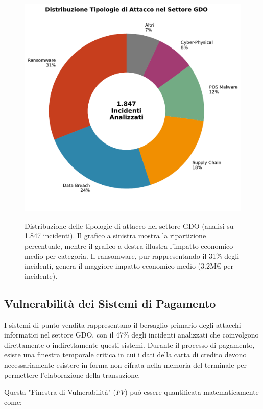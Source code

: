 \begin{figure}[htbp]
\centering
\includegraphics[width=\textwidth]{thesis_figures/cap2/fig_2_2_attack_types.pdf}
\caption{Distribuzione delle tipologie di attacco nel settore GDO (analisi su 1.847 incidenti). Il grafico a sinistra mostra la ripartizione percentuale, mentre il grafico a destra illustra l'impatto economico medio per categoria. Il ransomware, pur rappresentando il 31\% degli incidenti, genera il maggiore impatto economico medio (3.2M€ per incidente).}\autocite{CPR2025}
\label{fig:attack_types}
\end{figure}

\subsection{Vulnerabilità dei Sistemi di Pagamento}

I sistemi di punto vendita rappresentano il bersaglio primario degli attacchi informatici nel settore GDO, con il 47\% degli incidenti analizzati che coinvolgono direttamente o indirettamente questi sistemi. Durante il processo di pagamento, esiste una finestra temporale critica in cui i dati della carta di credito devono necessariamente esistere in forma non cifrata nella memoria del terminale per permettere l'elaborazione della transazione.

Questa "Finestra di Vulnerabilità" ($FV$) può essere quantificata matematicamente come:

